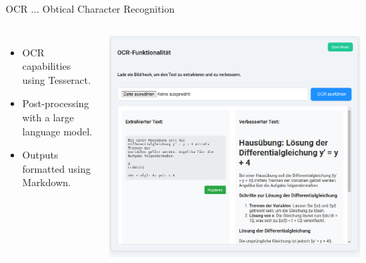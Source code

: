 \documentclass{beamer}
\begin{document}
\begin{frame}{OCR ... Obtical Character Recognition}
  \begin{columns}
      \begin{itemize}
        \item OCR capabilities using Tesseract.
        \item Post-processing with a large language model.
        \item Outputs formatted using Markdown.
      \end{itemize}
      \centering
      \includegraphics[width=\textwidth]{OCR-functonalatie.png}
  \end{columns}
\end{frame}
\end{document}
